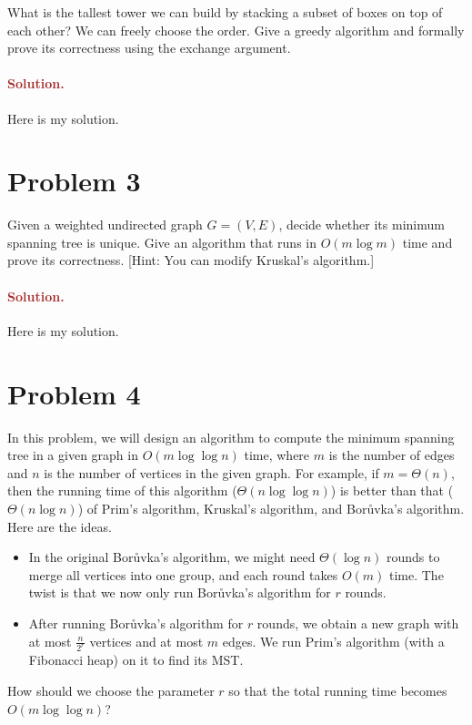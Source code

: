 What is the tallest tower we can build by stacking a subset of boxes on top of each other? We can freely choose the order. Give a greedy algorithm and formally prove its correctness using the exchange argument.

\paragraph{\textcolor{brown}{Solution.}}
Here is my solution.


\section*{Problem 3}
Given a weighted undirected graph $G = (V, E)$, decide whether its minimum spanning tree is unique. Give an algorithm that runs in $O(m \log m)$ time and prove its correctness. [Hint: You can modify Kruskal's algorithm.]


\paragraph{\textcolor{brown}{Solution.}}
Here is my solution.


\section*{Problem 4}
In this problem, we will design an algorithm to compute the minimum spanning tree in a given graph in $O(m \log \log n)$ time, where $m$ is the number of edges and $n$ is the number of vertices in the given graph. For example, if $m = \Theta(n)$, then the running time of this algorithm ($\Theta(n \log \log n)$) is better than that ($\Theta(n \log n)$) of Prim's algorithm, Kruskal's algorithm, and Bor\r{u}vka's algorithm.
Here are the ideas.
\begin{itemize}
    \item In the original Bor\r{u}vka's algorithm, we might need $\Theta(\log n)$ rounds to merge all vertices into one group, and each round takes $O(m)$ time. The twist is that we now only run Bor\r{u}vka's algorithm for $r$ rounds.
    \item After running Bor\r{u}vka's algorithm for $r$ rounds, we obtain a new graph with at most $\frac{n}{2^r}$ vertices and at most $m$ edges. We run Prim's algorithm (with a Fibonacci heap) on it to find its MST.
\end{itemize}
How should we choose the parameter $r$ so that the total running time becomes $O(m \log \log n)$?

